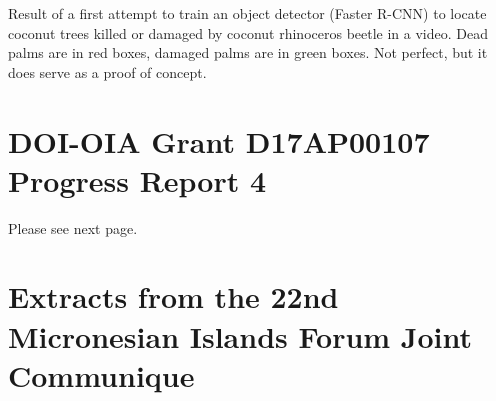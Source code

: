 \documentclass[12pt,letterpaper,english,bibliography=totocnumbered, abstract=on]{scrartcl}
\begin{document}
\begin{appendices}
Result of a first attempt to train an object detector (Faster R-CNN) to locate coconut trees killed or damaged by coconut rhinoceros beetle in a video. Dead palms are in red boxes, damaged palms are in green boxes. Not perfect, but it does serve as a proof of concept.

\clearpage

%

\section{DOI-OIA Grant D17AP00107 Progress Report 4}
\label{section report4}
Please see next page.


%

\section{\label{sec:Extracts-from-the}Extracts from the 22nd Micronesian
Islands Forum Joint Communique}


%
%
%
%
%
%

\end{appendices}
\end{document}
